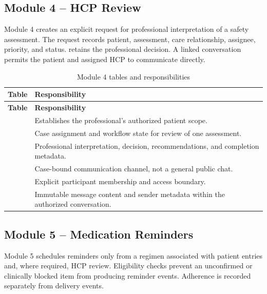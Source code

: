 \subsection{Module 4 -- HCP Review}

Module 4 creates an explicit request for professional interpretation of a safety assessment. The request records patient, assessment, care relationship, assignee, priority, and status.  retains the professional decision. A linked conversation permits the patient and assigned HCP to communicate directly.


\begin{longtable}{L{4.5cm}L{10.8cm}}
\caption{Module 4 tables and responsibilities}\label{tab:module4-tables}\\
\toprule
\textbf{Table} & \textbf{Responsibility}\\
\midrule
\endfirsthead
\toprule
\textbf{Table} & \textbf{Responsibility}\\
\midrule
\endhead
{} & Establishes the professional's authorized patient scope.\\
 & Case assignment and workflow state for review of one assessment.\\
 & Professional interpretation, decision, recommendations, and completion metadata.\\
 & Case-bound communication channel, not a general public chat.\\
 & Explicit participant membership and access boundary.\\
 & Immutable message content and sender metadata within the authorized conversation.\\
\bottomrule
\end{longtable}

\subsection{Module 5 -- Medication Reminders}

Module 5 schedules reminders only from a regimen associated with patient entries and, where required, HCP review. Eligibility checks prevent an unconfirmed or clinically blocked item from producing reminder events. Adherence is recorded separately from delivery events.

